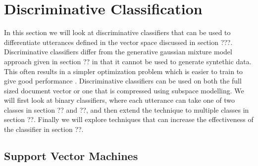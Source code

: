 \chapter{Discriminative Classification}
\label{sect:classify}

In this section we will look at discriminative classifiers that can be used to differentiate utterances defined in the vector space discussed in section ???. Discriminative classifiers differ from the generative gaussian mixture model approach given in section ?? in that it cannot be used to generate syntethic data. This often results in a simpler optimization problem which is easier to train to give good performance \cite[p. 204]{machinelearningbook}. Discriminative classifiers can be used on both the full sized document vector or one that is compressed using subspace modelling. We will first look at binary classifiers, where each utterance can take one of two classes in section ?? and ??, and then extend the technique to multiple classes in section ??. Finally we will explore techniques that can increase the effectiveness of the classifier in section ??.

\section{Support Vector Machines}
\label{sect:svm}


